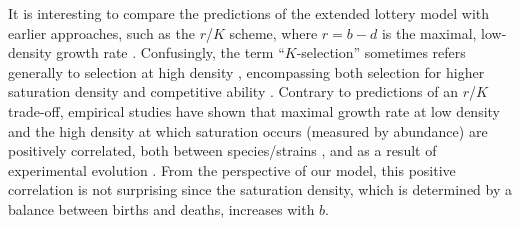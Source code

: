 \documentclass[11pt]{article}
\begin{document}
It is interesting to compare the predictions of the extended lottery model with earlier approaches, such as the $r$/$K$ scheme, where $r=b-d$ is the maximal, low-density growth rate \citep{pianka_1972}. Confusingly, the term ``$K$-selection'' sometimes refers generally to selection at high density \citep{pianka_1972}, encompassing both selection for higher saturation density \citep{macarthur_1967} and competitive ability \citep{gill_1974}. Contrary to predictions of an $r$/$K$ trade-off, empirical studies have shown that maximal growth rate at low density and the high density at which saturation occurs (measured by abundance) are positively correlated, both between species/strains \citep{luckinbill_1979,kuno_1991,hendriks_2005,fitzsimmons_2010}, and as a result of experimental evolution \citep{luckinbill_1978,luckinbill_1979}. From the perspective of our model, this positive correlation is not surprising since the saturation density, which is determined by a balance between births and deaths, increases with $b$. 

\end{document}
